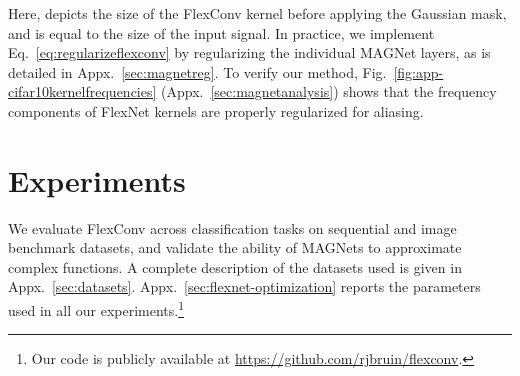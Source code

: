 \documentclass{article} \usepackage{iclr2022_conference,times}
\begin{document}
Here,  depicts the size of the FlexConv kernel before applying the Gaussian mask, and is equal to the size of the input signal. In practice, we implement Eq.~\ref{eq:regularizeflexconv} by regularizing the individual MAGNet layers, as is detailed in Appx.~\ref{sec:magnetreg}. To verify our method, Fig.~\ref{fig:app-cifar10kernelfrequencies} (Appx.~\ref{sec:magnetanalysis}) shows that the frequency components of FlexNet kernels are properly regularized for aliasing.
\vspace{-2mm}
\section{Experiments}\label{sec:experiments}
\vspace{-2mm}
We evaluate FlexConv across classification tasks on sequential and image benchmark datasets, and validate the ability of MAGNets to approximate complex functions. A complete description of the datasets used is given in Appx.~\ref{sec:datasets}. Appx.~\ref{sec:flexnet-optimization} reports the parameters used in all our experiments.\footnote{Our code is publicly available at \url{https://github.com/rjbruin/flexconv}.}
\vspace{-2mm}
\end{document}
